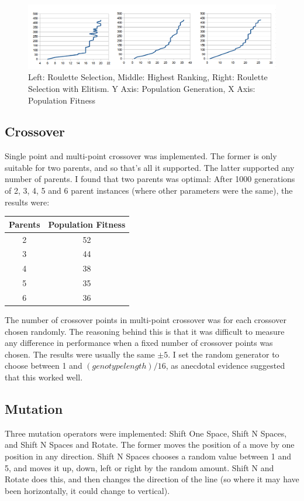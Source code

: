 \documentclass[]{report}
\begin{document}
\begin{figure}
	\centering
	\includegraphics[width=\textwidth]{figures/selectionGraphs.png}
	\caption{Left: Roulette Selection, Middle: Highest Ranking, Right: Roulette Selection with Elitism. Y Axis: Population Generation, X Axis: Population Fitness}
	\label{selectionGraphs}
\end{figure}

\subsection{Crossover}
Single point and multi-point crossover was implemented. The former is only suitable for two parents, and so that's all it supported. The latter supported any number of parents. I found that two parents was optimal: After 1000 generations of 2, 3, 4, 5 and 6 parent instances (where other parameters were the same), the results were:

\begin{center}
\begin{tabular}{c|c}
Parents & Population Fitness \\
\hline
2 & 52\\
3 & 44\\
4 & 38\\
5 & 35\\
6 & 36\\
\end{tabular}
\end{center}

The number of crossover points in multi-point crossover was for each crossover chosen randomly. The reasoning behind this is that it was difficult to measure any difference in performance when a fixed number of crossover points was chosen. The results were usually the same $\pm 5$. I set the random generator to choose between 1 and $(genotype length)/16$, as anecdotal evidence suggested that this worked well.\\

\subsection{Mutation}
Three mutation operators were implemented: Shift One Space, Shift N Spaces, and Shift N Spaces and Rotate. The former moves the position of a move by one position in any direction. Shift N Spaces chooses a random value between 1 and 5, and moves it up, down, left or right by the random amount. Shift N and Rotate does this, and then changes the direction of the line (so where it may have been horizontally, it could change to vertical).\\
\end{document}
